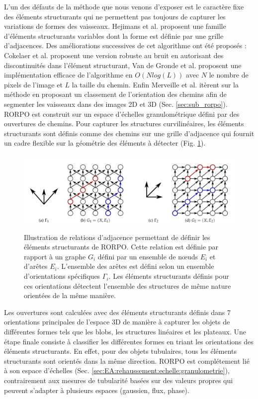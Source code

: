 L'un des défauts de la méthode que nous venons d'exposer est le caractère fixe des éléments structurants qui ne permettent pas toujours de capturer les variations de formes des vaisseaux. Hejimans et al. \cite{Heijmans2005_path_opening} proposent une famille d'éléments structurants variables dont la forme est définie par une grille d'adjacences. Des améliorations successives de cet algorithme ont été proposés : Cokelaer et al. \cite{Cokelaer2012_efficient_path_opening} proposent une version robuste au bruit en autorisant des discontinuités dans l'élément structurant, Van de Gronde et al. \cite{Gronde2015_fast_path_opening} proposent une implémentation efficace de l'algorithme en $O( N log ( L ))$ avec $N$ le nombre de pixels de l'image et $L$ la taille du chemin. Enfin Merveille et al. \cite{Merveille2018_curvilinear} itèrent sur la méthode en proposant un classement de l'orientation des chemins afin de segmenter les vaisseaux dans des images 2D et 3D (Sec. \ref{sec:sub_rorpo}). 
\label{sec:sub_rorpo}
RORPO \cite{Merveille2018_curvilinear} est construit sur un espace d'échelles granulométrique défini par des ouvertures de chemins. Pour capturer les structures curvilinéaires, les éléments structurants sont définis comme des chemins sur une grille d'adjacence qui fournit un cadre flexible sur la géométrie des éléments à détecter (Fig. \ref{fig:rorpo_adjacency}). 
\begin{figure}[!ht]
\centering
\includegraphics[height=4cm]{Images/rorpo_path.png}
\caption{Illustration de relations d'adjacence permettant de définir les éléments structurants de RORPO. Cette relation est définie par rapport à un graphe $G_i$ défini par un ensemble de nœuds $E_i$ et d'arêtes $E_i$. L'ensemble des arêtes est défini selon un ensemble d'orientations spécifiques $\Gamma_i$. Les éléments structurants définis pour ces orientations détectent l'ensemble des structures de même nature orientées de la même manière.}
\label{fig:rorpo_adjacency}
\end{figure}

Les ouvertures sont calculées avec des éléments structurants définis dans 7 orientations principales de l'espace 3D de manière à capturer les objets de différentes formes tels que les blobs, les structures linéaires et les plateaux. Une étape finale consiste à classifier les différentes formes en triant les orientations des éléments structurants. En effet, pour des objets tubulaires, tous les éléments structurants sont orientés dans la même direction. RORPO est complétement lié à son espace d'échelles (Sec. \ref{sec:EA:rehaussement:echelle:granulometrie}), contrairement aux mesures de tubularité basées sur des valeurs propres qui peuvent s'adapter à plusieurs espaces (gaussien, flux, phase).
